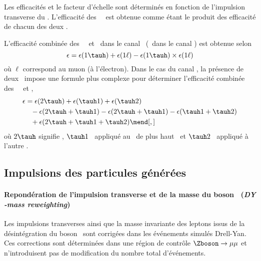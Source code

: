 Les efficacités et le facteur d'échelle sont déterminés en fonction de l'impulsion transverse du \tauh.
L'efficacité des \HLTpaths\ \HLTDoubleTau\ est obtenue comme étant le produit des efficacité de chacun des deux \tauh.
\par
L'efficacité combinée des \HLTpaths\ \HLTSingleTau\ et \HLTSingleMu\ dans le canal \mu\tauh\ (\HLTSingleEle\ dans le canal \ele\tauh) est obtenue selon
\begin{equation}
\epsilon = \epsilon(1\tauh) + \epsilon(1\ell) - \epsilon(1\tauh) \times \epsilon(1\ell)
\end{equation}
où $\ell$ correspond au muon (à l'électron).
Dans le cas du canal \tauh\tauh, la présence de deux \tauh\ impose une formule plus complexe pour déterminer l'efficacité combinée des \HLTpaths\ \HLTSingleTau\ et \HLTDoubleTau,
\begin{align}
\epsilon &= \epsilon(2\tauh) + \epsilon(\tauh1) + \epsilon(\tauh2)
\nonumber\\ & \hphantom{=}
- \epsilon(2\tauh + \tauh1) - \epsilon(2\tauh + \tauh1) - \epsilon(\tauh1+\tauh2)
\nonumber\\ & \hphantom{=}
+ \epsilon(2\tauh + \tauh1 + \tauh2)
\mend[,]
\end{align}
où $2\tauh$ signifie \HLTDoubleTau,
$\tauh1$ \HLTSingleTau\ appliqué au \tauh\ de plus haut \pT\ et
$\tauh2$ \HLTSingleTau\ appliqué à l'autre \tauh.
\subsection{Impulsions des particules générées}
\paragraph{Repondération de l'impulsion transverse et de la masse du boson \Zboson\ (\emph{DY \pT-mass reweighting})}
Les impulsions transverses ainsi que la masse invariante des leptons issus de la désintégration du boson \Zboson\ sont corrigées
dans les événements simulés Drell-Yan.
Ces corrections sont déterminées dans une région de contrôle $\Zboson\to\mu\mu$ et n'introduisent pas de modification du nombre total d'événements.
